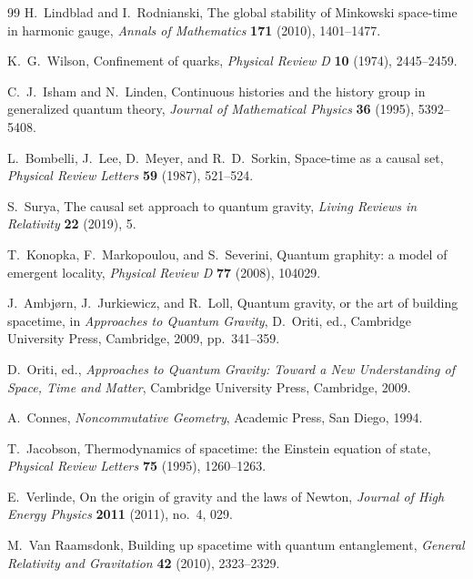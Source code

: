 \documentclass[11pt]{article}
\numberwithin{equation}{section}
\theoremstyle{definition}
\theoremstyle{remark}
\begin{document}
\begin{thebibliography}{99}
H.~Lindblad and I.~Rodnianski,
\newblock The global stability of Minkowski space-time in harmonic gauge,
\newblock \emph{Annals of Mathematics} \textbf{171} (2010), 1401--1477.

K.~G.~Wilson,
\newblock Confinement of quarks,
\newblock \emph{Physical Review D} \textbf{10} (1974), 2445--2459.

C.~J.~Isham and N.~Linden,
\newblock Continuous histories and the history group in generalized quantum
 theory,
\newblock \emph{Journal of Mathematical Physics} \textbf{36} (1995),
5392--5408.

L.~Bombelli, J.~Lee, D.~Meyer, and R.~D.~Sorkin,
\newblock Space-time as a causal set,
\newblock \emph{Physical Review Letters} \textbf{59} (1987), 521--524.

S.~Surya,
\newblock The causal set approach to quantum gravity,
\newblock \emph{Living Reviews in Relativity} \textbf{22} (2019), 5.

T.~Konopka, F.~Markopoulou, and S.~Severini,
\newblock Quantum graphity: a model of emergent locality,
\newblock \emph{Physical Review D} \textbf{77} (2008), 104029.

J.~Ambj{\o}rn, J.~Jurkiewicz, and R.~Loll,
\newblock Quantum gravity, or the art of building spacetime,
\newblock in \emph{Approaches to Quantum Gravity},
D.~Oriti, ed.,
Cambridge University Press, Cambridge, 2009, pp.~341--359.

D.~Oriti, ed.,
\newblock \emph{Approaches to Quantum Gravity: Toward a New Understanding of
Space, Time and Matter},
\newblock Cambridge University Press, Cambridge, 2009.

A.~Connes,
\newblock \emph{Noncommutative Geometry},
\newblock Academic Press, San Diego, 1994.

T.~Jacobson,
\newblock Thermodynamics of spacetime: the Einstein equation of state,
\newblock \emph{Physical Review Letters} \textbf{75} (1995), 1260--1263.

E.~Verlinde,
\newblock On the origin of gravity and the laws of Newton,
\newblock \emph{Journal of High Energy Physics} \textbf{2011} (2011), no.~4,
029.

M.~Van Raamsdonk,
\newblock Building up spacetime with quantum entanglement,
\newblock \emph{General Relativity and Gravitation} \textbf{42} (2010),
2323--2329.


\end{thebibliography}
\end{document}
